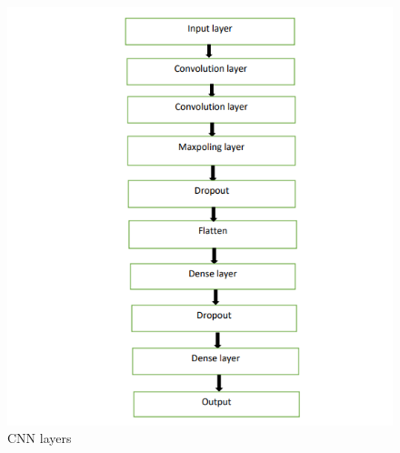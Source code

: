 \documentclass[conference]{IEEEtran}
\begin{document}
\begin{center}
    \begin{figure}
        \includegraphics[width=\linewidth]{475f.png}
        \caption{CNN layers}
        \label{fig:CNN_Layers}
    \end{figure}
\end{center}
\end{document}
